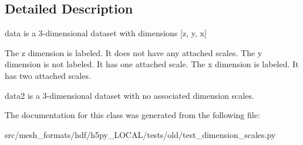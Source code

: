 \subsection{Detailed Description}
\begin{DoxyVerb}data is a 3-dimensional dataset with dimensions [z, y, x]

The z dimension is labeled. It does not have any attached scales.
The y dimension is not labeled. It has one attached scale.
The x dimension is labeled. It has two attached scales.

data2 is a 3-dimensional dataset with no associated dimension scales.
\end{DoxyVerb}
 

The documentation for this class was generated from the following file\+:\begin{DoxyCompactItemize}
\item 
src/mesh\+\_\+formats/hdf/h5py\+\_\+\+L\+O\+C\+A\+L/tests/old/test\+\_\+dimension\+\_\+scales.\+py\end{DoxyCompactItemize}
